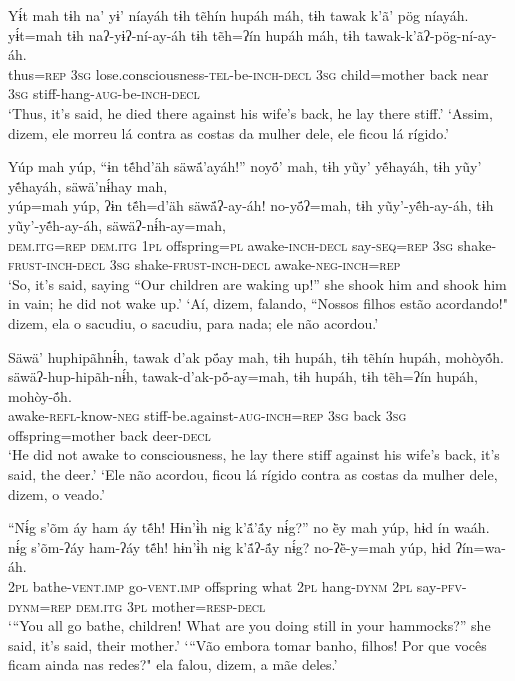 \documentclass[output=paper,
modfonts,nonflat
]{langsci/langscibook}
\begin{document}
\ea  Yɨ́t mah tɨh na’ yɨ’ níayáh tɨh tẽhín hupáh máh, tɨh tawak k’ã’ pög níayáh.\\ 
\gll yɨ́t=mah tɨh naʔ-yɨʔ-ní-ay-áh tɨh tẽh=ʔín hupáh máh, tɨh tawak-k’ãʔ-pög-ní-ay-áh.\\
     thus\textsc{=rep} \textsc{3sg} lose.consciousness\textsc{-tel-}be\textsc{-inch-decl} \textsc{3sg} child=mother back near \textsc{3sg} stiff-hang\textsc{-aug-}be\textsc{-inch-decl}\\
\glt ‘Thus, it’s said, he died there against his wife’s back, he lay there stiff.'
\glt ‘Assim, dizem, ele morreu lá contra as costas da mulher dele, ele ficou lá rígido.'
\z 

\ea  Yúp mah yúp, “ɨn tẽ́hd’äh säwä́’ayáh!” noyö́’ mah, tɨh yũy’ yẽ́hayáh, tɨh yũy’ yẽ́hayáh, säwä’nɨ́hay mah,\\
\gll yúp=mah yúp, ʔɨn tẽ́h=d’äh säwä́ʔ-ay-áh! no-yö́ʔ=mah, tɨh yũy’-yẽ́h-ay-áh, tɨh yũy’-yẽ́h-ay-áh, säwäʔ-nɨ́h-ay=mah,\\
     \textsc{dem.itg=rep} \textsc{dem.itg} \textsc{1pl} offspring\textsc{=pl} awake\textsc{-inch-decl} say\textsc{-seq=rep} \textsc{3sg} shake\textsc{-frust-inch-decl} \textsc{3sg} shake\textsc{-frust-inch-decl} awake\textsc{-neg-inch=rep}\\
\glt ‘So, it’s said, saying “Our children are waking up!” she shook him and shook him in vain; he did not wake up.'
\glt ‘Aí, dizem, falando, “Nossos filhos estão acordando!" dizem, ela o sacudiu, o sacudiu, para nada; ele não acordou.'
\z 

\ea  Säwä’ huphipãhnɨ́h, tawak d’ak pö́ay mah, tɨh hupáh, tɨh tẽhín hupáh, mohòyṍh.\\
\gll säwäʔ-hup-hipãh-nɨ́h, tawak-d’ak-pö́-ay=mah, tɨh hupáh, tɨh tẽh=ʔín hupáh, mohòy-ṍh.\\
     awake\textsc{-refl-}know\textsc{-neg} stiff-be.against\textsc{-aug-inch=rep} \textsc{3sg} back \textsc{3sg} offspring=mother back deer\textsc{-decl}\\
\glt ‘He did not awake to consciousness, he lay there stiff against his wife's back, it’s said, the deer.'
\glt ‘Ele não acordou, ficou lá rígido contra as costas da mulher dele, dizem, o veado.'
\z 

\ea  “Nɨ́g s’õm áy ham áy tẽ́h! Hɨn’ɨ̀h nɨg k’ã́’ã́y nɨ́g?” no ë̀y mah yúp, hɨd ín waáh.\\
\gll nɨ́g s’õm-ʔáy ham-ʔáy tẽ́h! hɨn’ɨ̀h nɨg k’ã́ʔ-ã́y nɨ́g? no-ʔë̀-y=mah yúp, hɨd ʔín=wa-áh.\\
     \textsc{2pl} bathe\textsc{-vent.imp} go\textsc{-vent.imp}  offspring what \textsc{2pl} hang\textsc{-dynm} \textsc{2pl} say\textsc{-pfv-dynm=rep} \textsc{dem.itg} \textsc{3pl} mother\textsc{=resp-decl}\\
\glt ‘“You all go bathe, children! What are you doing still in your hammocks?” she said, it’s said, their mother.'
\glt ‘“Vão embora tomar banho, filhos! Por que vocês ficam ainda nas redes?" ela falou, dizem, a mãe deles.'
\z 
\end{document}
